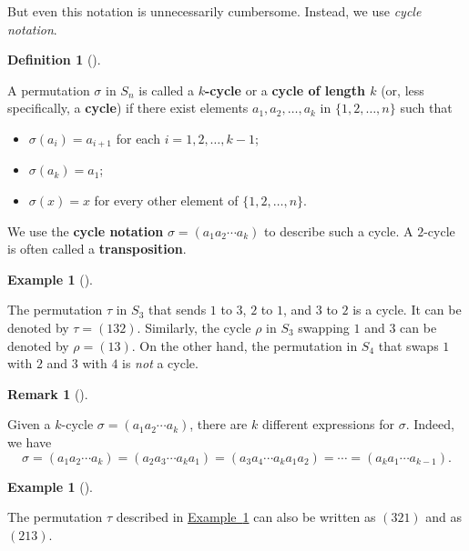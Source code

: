 \documentclass[10pt,]{book}
\newcommand{\terminology}[1]{\textbf{#1}}
\theoremstyle{plain}
\theoremstyle{definition}
\newtheorem{definition}[theorem]{Definition}
\theoremstyle{definition}
\newtheorem{remark}[theorem]{Remark}
\theoremstyle{definition}
\newtheorem{example}[theorem]{Example}
\theoremstyle{definition}
\numberwithin{equation}{section}
\begin{document}
    But even this notation is unnecessarily cumbersome. Instead, we
    use \emph{cycle notation}.
\begin{definition}[{}]\label{definition-45}

        A permutation \(\sigma\) in \(S_n\) is called a \terminology{\(k\)-cycle} or a \terminology{cycle of length \(k\)} (or, less
        specifically, a \terminology{cycle}) if there exist elements \(a_1,
        a_2,\ldots, a_k\) in \(\{1,2,\ldots,n\}\) such that

      \leavevmode%
\begin{itemize}[label=\textbullet]
\item{}
        \(\sigma(a_i)=a_{i+1}\) for each \(i=1,2,\ldots, k-1\);%
\item{}\(\sigma(a_k)=a_1\);%
\item{}\(\sigma(x)=x\) for every other element of \(\{1,2,\ldots, n\}\).%
\end{itemize}

%
\par

        We use the \terminology{cycle notation} \(\sigma = (a_1 a_2 \cdots a_k)\) to describe such a cycle. A \(2\)-cycle is often called a \terminology{transposition}.
\end{definition}
\begin{example}[]\label{tr}

        The permutation \(\tau\) in \(S_3\) that sends \(1\) to \(3\), \(2\) to \(1\), and \(3\) to \(2\) is a cycle. It can be denoted by \(\tau =(132)\).
        Similarly, the cycle \(\rho\) in \(S_3\) swapping \(1\) and \(3\) can be denoted by \(\rho=(13)\). On the other hand, the permutation in \(S_4\) that swaps \(1\) with \(2\) and \(3\) with \(4\) is
        \emph{not} a cycle.
\end{example}
\begin{remark}[]\label{remark-27}

      Given a \(k\)-cycle \(\sigma=(a_1 a_2\cdots a_k)\), there are \(k\) different expressions for \(\sigma\). Indeed, we have
\begin{equation*}

        \sigma=(a_1 a_2\cdots a_k)=(a_2 a_3 \cdots a_k a_1)=(a_3 a_4 \cdots a_k a_1 a_2)=\cdots = (a_k a_1 \cdots a_{k-1}).
      
\end{equation*}

\end{remark}
\begin{example}[]\label{example-54}

        The permutation \(\tau\) described in \hyperref[tr]{Example~\ref{tr}} can also be written as \((321)\) and as \((213)\).
\end{example}
\par
\end{document}
